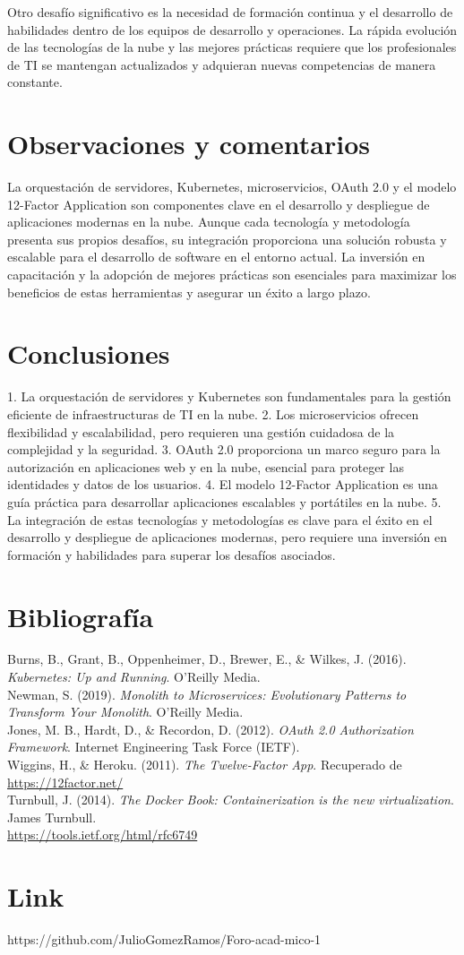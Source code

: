 \documentclass[12pt]{article}
\begin{document}
Otro desafío significativo es la necesidad de formación continua y el desarrollo de habilidades dentro de los equipos de desarrollo y operaciones. La rápida evolución de las tecnologías de la nube y las mejores prácticas requiere que los profesionales de TI se mantengan actualizados y adquieran nuevas competencias de manera constante.

\section*{Observaciones y comentarios}
La orquestación de servidores, Kubernetes, microservicios, OAuth 2.0 y el modelo 12-Factor Application son componentes clave en el desarrollo y despliegue de aplicaciones modernas en la nube. Aunque cada tecnología y metodología presenta sus propios desafíos, su integración proporciona una solución robusta y escalable para el desarrollo de software en el entorno actual. La inversión en capacitación y la adopción de mejores prácticas son esenciales para maximizar los beneficios de estas herramientas y asegurar un éxito a largo plazo.

\section*{Conclusiones}
1. La orquestación de servidores y Kubernetes son fundamentales para la gestión eficiente de infraestructuras de TI en la nube.
2. Los microservicios ofrecen flexibilidad y escalabilidad, pero requieren una gestión cuidadosa de la complejidad y la seguridad.
3. OAuth 2.0 proporciona un marco seguro para la autorización en aplicaciones web y en la nube, esencial para proteger las identidades y datos de los usuarios.
4. El modelo 12-Factor Application es una guía práctica para desarrollar aplicaciones escalables y portátiles en la nube.
5. La integración de estas tecnologías y metodologías es clave para el éxito en el desarrollo y despliegue de aplicaciones modernas, pero requiere una inversión en formación y habilidades para superar los desafíos asociados.

\section*{Bibliografía}
Burns, B., Grant, B., Oppenheimer, D., Brewer, E., \& Wilkes, J. (2016). \textit{Kubernetes: Up and Running}. O'Reilly Media.\\
Newman, S. (2019). \textit{Monolith to Microservices: Evolutionary Patterns to Transform Your Monolith}. O'Reilly Media.\\
Jones, M. B., Hardt, D., \& Recordon, D. (2012). \textit{OAuth 2.0 Authorization Framework}. Internet Engineering Task Force (IETF).\\
Wiggins, H., \& Heroku. (2011). \textit{The Twelve-Factor App}. Recuperado de \url{https://12factor.net/}\\
Turnbull, J. (2014). \textit{The Docker Book: Containerization is the new virtualization}. James Turnbull.\\
\url{https://tools.ietf.org/html/rfc6749}

\section*{Link} 
https://github.com/JulioGomezRamos/Foro-acad-mico-1
\end{document}
